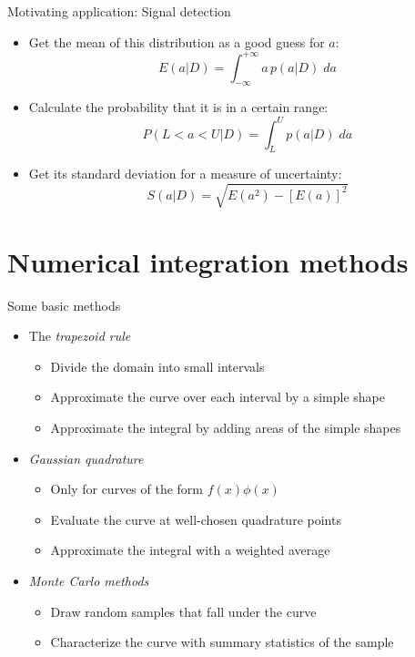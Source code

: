 \documentclass{beamer}
\begin{document}
\begin{frame}{Motivating application: Signal detection}
\begin{itemize}
\item Get the mean of this distribution as a good guess for $a$: $$E(a | D) = \int_{-\infty}^{+\infty} a\, p(a | D)\;da$$
\item Calculate the probability that it is in a certain range: $$P(L < a < U | D) = \int_L^U p(a | D)\;da$$
\item Get its standard deviation for a measure of uncertainty: $$S(a | D) = \sqrt{E(a^2) - \left[E(a)\right]^2}$$
\end{itemize}
\end{frame}



\section{Numerical integration methods}


\begin{frame}{Some basic methods}
\begin{itemize}
\item The \emph{trapezoid rule}
\begin{itemize}
\item Divide the domain into small intervals
\item Approximate the curve over each interval by a simple shape
\item Approximate the integral by adding areas of the simple shapes
\end{itemize}
\item \emph{Gaussian quadrature}
\begin{itemize}
\item Only for curves of the form $f(x)\phi(x)$
\item Evaluate the curve at well-chosen quadrature points
\item Approximate the integral with a weighted average
\end{itemize}
\item \emph{Monte Carlo methods}
\begin{itemize}
\item Draw random samples that fall under the curve
\item Characterize the curve with summary statistics of the sample
\end{itemize}
\end{itemize}
\end{frame}
\end{document}
